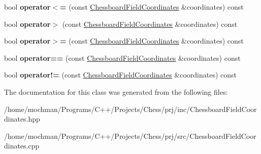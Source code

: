 \begin{DoxyCompactItemize}
\item 
\hypertarget{class_chessboard_field_coordinates_a635de4b492c0f141fd4f02d52f08997f}{bool {\bfseries operator$<$=} (const \hyperlink{class_chessboard_field_coordinates}{Chessboard\-Field\-Coordinates} \&coordinates) const }\label{class_chessboard_field_coordinates_a635de4b492c0f141fd4f02d52f08997f}

\item 
\hypertarget{class_chessboard_field_coordinates_a05d2f029931dae62078ec884114b511a}{bool {\bfseries operator$>$} (const \hyperlink{class_chessboard_field_coordinates}{Chessboard\-Field\-Coordinates} \&coordinates) const }\label{class_chessboard_field_coordinates_a05d2f029931dae62078ec884114b511a}

\item 
\hypertarget{class_chessboard_field_coordinates_aa601fe22a60c8b056146f35468d28f1c}{bool {\bfseries operator$>$=} (const \hyperlink{class_chessboard_field_coordinates}{Chessboard\-Field\-Coordinates} \&coordinates) const }\label{class_chessboard_field_coordinates_aa601fe22a60c8b056146f35468d28f1c}

\item 
\hypertarget{class_chessboard_field_coordinates_aaefa658a0782be8ea9ac6296e3a12865}{bool {\bfseries operator==} (const \hyperlink{class_chessboard_field_coordinates}{Chessboard\-Field\-Coordinates} \&coordinates) const }\label{class_chessboard_field_coordinates_aaefa658a0782be8ea9ac6296e3a12865}

\item 
\hypertarget{class_chessboard_field_coordinates_a5b9b422afb3387f8c3c5e94a67b16f80}{bool {\bfseries operator!=} (const \hyperlink{class_chessboard_field_coordinates}{Chessboard\-Field\-Coordinates} \&coordinates) const }\label{class_chessboard_field_coordinates_a5b9b422afb3387f8c3c5e94a67b16f80}

\end{DoxyCompactItemize}


The documentation for this class was generated from the following files\-:\begin{DoxyCompactItemize}
\item 
/home/mochman/\-Programs/\-C++/\-Projects/\-Chess/prj/inc/Chessboard\-Field\-Coordinates.\-hpp\item 
/home/mochman/\-Programs/\-C++/\-Projects/\-Chess/prj/src/Chessboard\-Field\-Coordinates.\-cpp\end{DoxyCompactItemize}
